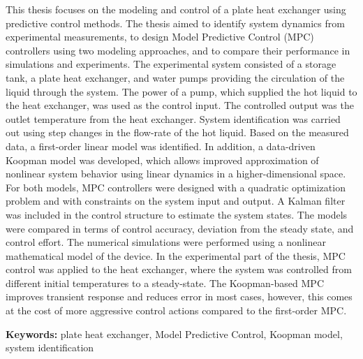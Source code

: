 This thesis focuses on the modeling and control of a plate heat exchanger using predictive control methods. The thesis aimed to identify system dynamics from experimental measurements, to design Model Predictive Control (MPC) controllers using two modeling approaches, and to compare their performance in simulations and experiments. 
The experimental system consisted of a storage tank, a plate heat exchanger, and water pumps providing the circulation of the liquid through the system. The power of a pump, which supplied the hot liquid to the heat exchanger, was used as the control input. The controlled output was the outlet temperature from the heat exchanger.
System identification was carried out using step changes in the flow-rate of the hot liquid. 
Based on the measured data, a first-order linear model was identified. In addition, a data-driven Koopman model was developed, which allows improved approximation of nonlinear system behavior using linear dynamics in a higher-dimensional space.
For both models, MPC controllers were designed with a quadratic optimization problem and with constraints on the system input and output. A Kalman filter was included in the control structure to estimate the system states. The models were compared in terms of control accuracy, deviation from the steady state, and control effort. The numerical simulations were performed using a nonlinear mathematical model of the device.
In the experimental part of the thesis, MPC control was applied to the heat exchanger, where the system was controlled from different initial temperatures to a steady-state. The Koopman-based MPC improves transient response and reduces error in most cases, however, this comes at the cost of more aggressive control actions compared to the first-order MPC.

\vspace{0.5cm}
\noindent\textbf{Keywords:} plate heat exchanger, Model Predictive Control, Koopman model, system identification